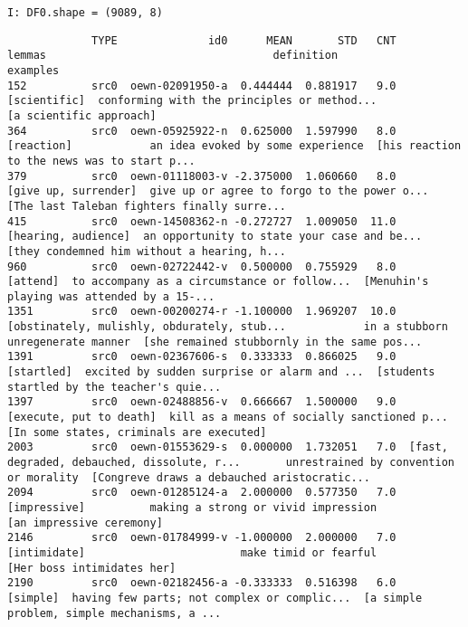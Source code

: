 \documentclass[a4paper,10pt,onecolumn,oneside,openright]{article}
\begin{document}
\begin{verbatim}
I: DF0.shape = (9089, 8)
\end{verbatim}

\begin{verbatim}
             TYPE              id0      MEAN       STD   CNT                                       lemmas                                   definition                                     examples
152          src0  oewn-02091950-a  0.444444  0.881917   9.0                                 [scientific]  conforming with the principles or method...                      [a scientific approach]
364          src0  oewn-05925922-n  0.625000  1.597990   8.0                                   [reaction]            an idea evoked by some experience  [his reaction to the news was to start p...
379          src0  oewn-01118003-v -2.375000  1.060660   8.0                         [give up, surrender]  give up or agree to forgo to the power o...  [The last Taleban fighters finally surre...
415          src0  oewn-14508362-n -0.272727  1.009050  11.0                          [hearing, audience]  an opportunity to state your case and be...  [they condemned him without a hearing, h...
960          src0  oewn-02722442-v  0.500000  0.755929   8.0                                     [attend]  to accompany as a circumstance or follow...  [Menuhin's playing was attended by a 15-...
1351         src0  oewn-00200274-r -1.100000  1.969207  10.0  [obstinately, mulishly, obdurately, stub...            in a stubborn unregenerate manner  [she remained stubbornly in the same pos...
1391         src0  oewn-02367606-s  0.333333  0.866025   9.0                                   [startled]  excited by sudden surprise or alarm and ...  [students startled by the teacher's quie...
1397         src0  oewn-02488856-v  0.666667  1.500000   9.0                      [execute, put to death]  kill as a means of socially sanctioned p...     [In some states, criminals are executed]
2003         src0  oewn-01553629-s  0.000000  1.732051   7.0  [fast, degraded, debauched, dissolute, r...       unrestrained by convention or morality  [Congreve draws a debauched aristocratic...
2094         src0  oewn-01285124-a  2.000000  0.577350   7.0                                 [impressive]          making a strong or vivid impression                     [an impressive ceremony]
2146         src0  oewn-01784999-v -1.000000  2.000000   7.0                                 [intimidate]                        make timid or fearful                   [Her boss intimidates her]
2190         src0  oewn-02182456-a -0.333333  0.516398   6.0                                     [simple]  having few parts; not complex or complic...  [a simple problem, simple mechanisms, a ...

\end{verbatim}
\end{document}
